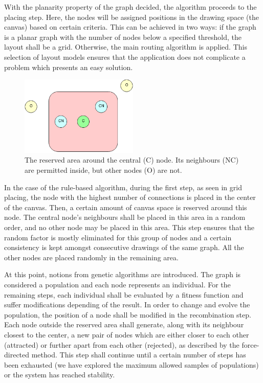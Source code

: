 With the planarity property of the graph decided, the algorithm proceeds to the placing step. Here, the nodes will be assigned positions in the 
drawing space (the canvas) based on certain criteria. This can be achieved in two ways: if the graph is a planar graph with the number of nodes 
below a specified threshold, the layout shall be a grid. Otherwise, the main routing algorithm is applied. This selection of layout models ensures 
that the application does not complicate a problem which presents an easy solution.

\begin{figure}[ht] \centering
\includegraphics[width=0.5\textwidth]{img/algdesing/centralnode.png}
\caption{The reserved area around the central (C) node. Its neighbours (NC) are permitted inside, but other nodes (O) are not.} \end{figure}

In the case of the rule-based algorithm, during the first step, as seen in grid placing, the node with the highest number of connections is 
placed in the center of the canvas. Then, a certain amount of canvas space is reserved around this node. The central node's neighbours 
shall be placed in this area in a random order, and no other node may be placed in this area. This step ensures that the random factor is mostly eliminated 
 for this group of nodes and a certain consistency is kept amongst consecutive drawings of the same graph. All the other nodes are placed randomly in the remaining area.

At this point, notions from genetic algorithms are introduced. The graph is considered a population and each node represents an individual. For the 
remaining steps, each individual shall be evaluated by a fitness function and suffer modifications depending of the result. In order to change and evolve 
the population, the position of a node shall be modified in the recombination step. Each node outside the reserved area shall generate, along with its neighbour closest to 
the center, a new pair of nodes which are either closer to each other (attracted) or further apart from each other (rejected), as described by the force-directed method. This step shall 
continue until a certain number of steps has been exhausted (we have explored the maximum allowed samples of populations) or the system has reached stability.

